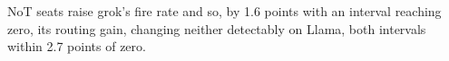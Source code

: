 NoT seats raise grok's fire rate and so, by 1.6 points with an interval
reaching zero, its routing gain, changing neither detectably
on Llama, both intervals within 2.7 points of zero.
